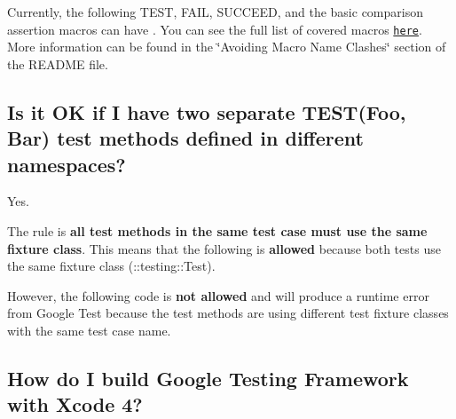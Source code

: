 Currently, the following {\ttfamily T\+E\+ST}, {\ttfamily F\+A\+IL}, {\ttfamily S\+U\+C\+C\+E\+ED}, and the basic comparison assertion macros can have . You can see the full list of covered macros \href{../include/gtest/gtest.h}{\tt here}. More information can be found in the \char`\"{}\+Avoiding Macro Name Clashes\char`\"{} section of the R\+E\+A\+D\+ME file.

\subsection*{Is it OK if I have two separate {\ttfamily T\+E\+S\+T(\+Foo, Bar)} test methods defined in different namespaces?}

Yes.

The rule is {\bfseries all test methods in the same test case must use the same fixture class}. This means that the following is {\bfseries allowed} because both tests use the same fixture class ({\ttfamily \+::testing\+::\+Test}).


\begin{DoxyCode}{0}
\DoxyCodeLine{\}}
\DoxyCodeLine{}
\DoxyCodeLine{\}}
\end{DoxyCode}


However, the following code is {\bfseries not allowed} and will produce a runtime error from Google Test because the test methods are using different test fixture classes with the same test case name.


\begin{DoxyCode}{0}
\DoxyCodeLine{\}}
\DoxyCodeLine{}
\DoxyCodeLine{\}}
\end{DoxyCode}


\subsection*{How do I build Google Testing Framework with Xcode 4?}

